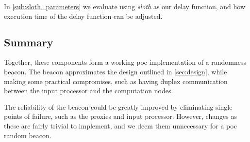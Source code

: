 In \vref{sub:sloth_parameters} we evaluate using \textit{sloth} as our delay function, and how execution time of the delay function can be adjusted.

\subsection{Summary}
Together, these components form a working \acrshort{poc} implementation of a randomness beacon.
The beacon approximates the design outlined in \cref{sec:design}, while making some practical compromises, such as having duplex communication between the input processor and the computation nodes.

The reliability of the beacon could be greatly improved by eliminating single points of failure, such as the proxies and input processor.
However, changes as these are fairly trivial to implement, and we deem them unnecessary for a \gls{poc} random beacon.
